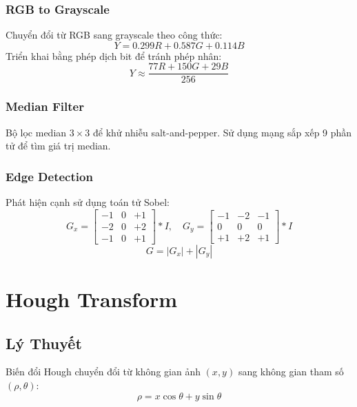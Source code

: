 \documentclass[12pt,a4paper]{report}
\begin{document}
\subsection{RGB to Grayscale}
Chuyển đổi từ RGB sang grayscale theo công thức:
\begin{equation}
    Y = 0.299R + 0.587G + 0.114B
\end{equation}
Triển khai bằng phép dịch bit để tránh phép nhân:
\begin{equation}
    Y \approx \frac{77R + 150G + 29B}{256}
\end{equation}

\subsection{Median Filter}
Bộ lọc median $3\times3$ để khử nhiễu salt-and-pepper. Sử dụng mạng sắp xếp 9 phần tử để tìm giá trị median.

\subsection{Edge Detection}
Phát hiện cạnh sử dụng toán tử Sobel:
\begin{equation}
    G_x = \begin{bmatrix} -1 & 0 & +1 \\ -2 & 0 & +2 \\ -1 & 0 & +1 \end{bmatrix} * I, \quad
    G_y = \begin{bmatrix} -1 & -2 & -1 \\ 0 & 0 & 0 \\ +1 & +2 & +1 \end{bmatrix} * I
\end{equation}
\begin{equation}
    G = |G_x| + |G_y|
\end{equation}

\chapter{Hough Transform}

\section{Lý Thuyết}
Biến đổi Hough chuyển đổi từ không gian ảnh $(x,y)$ sang không gian tham số $(\rho, \theta)$:
\begin{equation}
    \rho = x \cos\theta + y \sin\theta
\end{equation}
\end{document}
